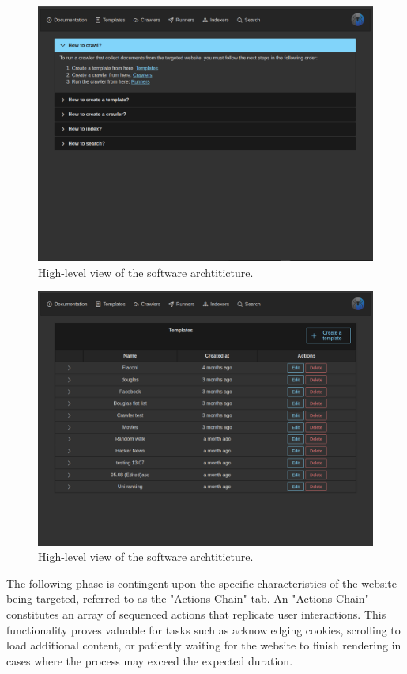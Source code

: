 \begin{figure}[h]	
     \centering
     \includegraphics[width=13cm]{images/demo-1.png}
     \caption{High-level view of the software archtiticture.}
     \label{fig:software-arch}
\end{figure}

\begin{figure}[h]	
     \centering
     \includegraphics[width=13cm]{images/demo-2.png}
     \caption{High-level view of the software archtiticture.}
     \label{fig:software-arch}
\end{figure}

The following phase is contingent upon the specific characteristics of the website being targeted, referred to as the "Actions Chain" tab. An "Actions Chain" constitutes an array of sequenced actions that replicate user interactions. This functionality proves valuable for tasks such as acknowledging cookies, scrolling to load additional content, or patiently waiting for the website to finish rendering in cases where the process may exceed the expected duration.


